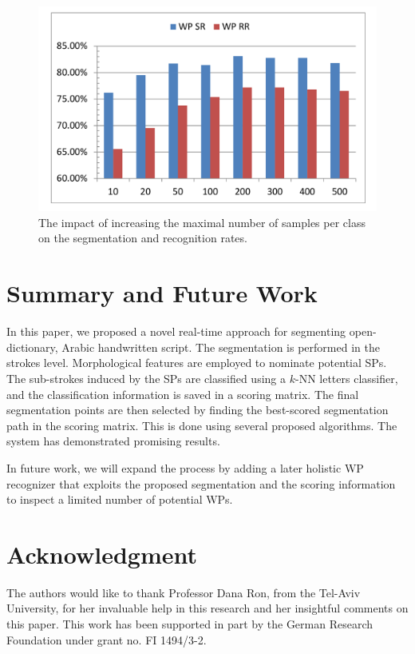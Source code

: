\documentclass[10pt, conference, compsocconf]{IEEEtran}
\begin{document}
\begin{figure}
\centering
\includegraphics[width=1\columnwidth]{./figures/num_letter_impact}
\caption{The impact of increasing the maximal number of samples per class on the segmentation and recognition rates.}
\label{fig:num_letter_impact}
\vspace{-15pt}
\end{figure}

\section{Summary and Future Work}
In this paper, we proposed a novel real-time approach for segmenting open-dictionary, Arabic handwritten script.
The segmentation is performed in the strokes level. 
Morphological features are employed to nominate potential SPs. 
The sub-strokes induced by the SPs are classified using a $k$-NN letters classifier, and the classification information is saved in a scoring matrix.
The final segmentation points are then selected by finding the best-scored segmentation path in the scoring matrix. 
This is done using several proposed algorithms. 
The system has demonstrated promising results.

In future work, we will expand the process by adding a later holistic WP recognizer that exploits the proposed segmentation and the scoring information to inspect a limited number of potential WPs.



\section*{Acknowledgment}
The authors would like to thank Professor Dana Ron, from the Tel-Aviv University, for her invaluable help in this research and her insightful comments on this paper. This work has been supported in part by the German Research Foundation under grant no. FI 1494/3-2.

\linespread{0.88}



\end{document}
